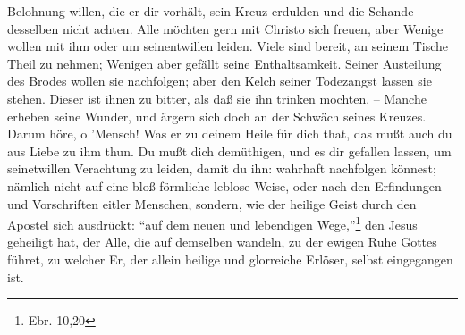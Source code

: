 Belohnung willen, die er dir vorhält, sein Kreuz erdulden und die Schande desselben nicht achten. Alle möchten gern mit Christo sich freuen, aber Wenige wollen mit ihm oder um seinentwillen leiden. Viele sind bereit, an seinem Tische Theil zu nehmen; Wenigen aber gefällt seine Enthaltsamkeit. Seiner Austeilung des Brodes wollen sie nachfolgen; aber den Kelch seiner Todezangst lassen sie stehen. Dieser ist ihnen zu bitter, als daß sie ihn trinken mochten. -- Manche erheben seine Wunder, und ärgern sich doch an der Schwäch seines Kreuzes. Darum höre, o ’Mensch! Was er zu deinem Heile für dich that, das mußt auch du aus Liebe zu ihm thun. Du mußt dich demüthigen, und es dir gefallen lassen, um seinetwillen Verachtung zu leiden, damit du ihn: wahrhaft nachfolgen könnest; nämlich nicht auf eine bloß förmliche leblose Weise, oder nach den Erfindungen und Vorschriften eitler Menschen, sondern, wie der heilige Geist durch den Apostel sich ausdrückt: "`auf dem neuen und lebendigen Wege,"'\footnote{Ebr. 10,20} den Jesus geheiligt hat, der Alle, die auf demselben wandeln, zu der ewigen Ruhe Gottes führet, zu welcher Er, der allein heilige und glorreiche Erlöser, selbst eingegangen ist.


